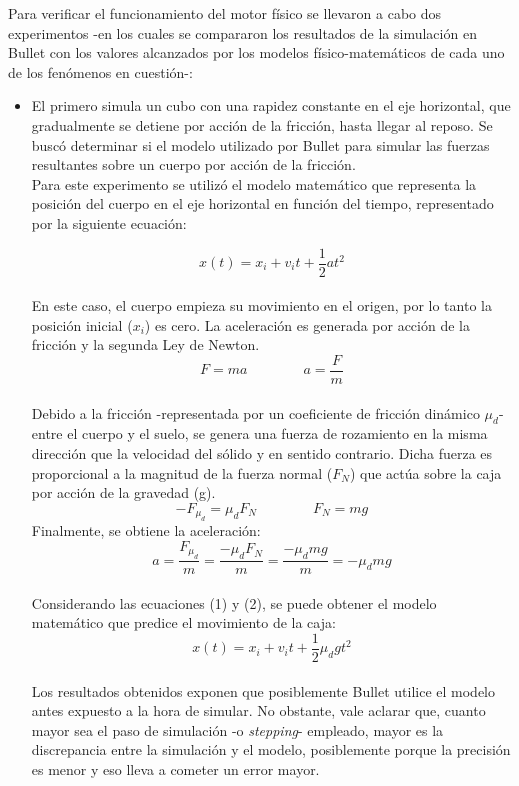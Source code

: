 \documentclass{article}
\begin{document}
Para verificar el funcionamiento del motor f\'isico se llevaron a cabo dos experimentos  -en los cuales se compararon los resultados de la simulaci\'on en Bullet con los valores alcanzados por los modelos f\'isico-matem\'aticos de cada uno de los fen\'omenos en cuesti\'on-:\\
\begin{itemize}
\item El primero simula un cubo con una rapidez constante en el eje horizontal, que gradualmente se detiene por acci\'on de la fricci\'on, hasta llegar al reposo. Se busc\'o determinar si el modelo utilizado por Bullet para simular las fuerzas resultantes sobre un cuerpo por acci\'on de la fricci\'on. \\
Para este experimento se utiliz\'o el modelo matem\'atico que representa la posici\'on del cuerpo en el eje horizontal en funci\'on del tiempo, representado por la siguiente ecuaci\'on:
 
 \begin{equation}
  x(t) = x_i +v_i t+\frac{1}{2} at^2
\end{equation}
\\ En este caso, el cuerpo empieza su movimiento en el origen, por lo tanto la posici\'on inicial ($x_i$) es cero. La aceleraci\'on es generada por acci\'on de la fricci\'on y la segunda Ley de Newton.\\
 
\[
  F = ma \qquad\text{}\qquad a=\frac{F}{m}
\]
\\Debido a la fricci\'on -representada por un coeficiente de fricci\'on din\'amico $\mu_d$-  entre el cuerpo y el suelo, se genera una fuerza de rozamiento en la misma direcci\'on que la velocidad del s\'olido y en sentido contrario. Dicha fuerza es proporcional a la magnitud de la fuerza normal ($F_N$) que act\'ua sobre la caja por acci\'on de la gravedad (g).
\[
  -F_{\mu_d} = \mu_d F_N \qquad\text{}\qquad F_N=mg
\]
Finalmente, se obtiene la aceleraci\'on:\\
 \begin{equation}
  a = \frac{F_{\mu_d}}{m}= \frac{-\mu_dF_N}{m} = \frac{-\mu_d mg}{m} = -\mu_dmg
\end{equation}
\\Considerando las ecuaciones (1) y (2), se puede obtener el modelo matem\'atico que predice el movimiento de la caja:\\
 \begin{equation}
  x(t) = x_i +v_i t+\frac{1}{2} \mu_d gt^2
\end{equation}
\\Los resultados obtenidos exponen que posiblemente Bullet utilice el modelo antes expuesto a la hora de simular. No obstante, vale aclarar que, cuanto mayor sea el paso de simulaci\'on  -o \textit{stepping}- empleado, mayor es la discrepancia entre la simulaci\'on y el modelo, posiblemente porque la precisi\'on es menor y eso lleva a cometer un error mayor. \\ 


\end{itemize}
\end{document}

